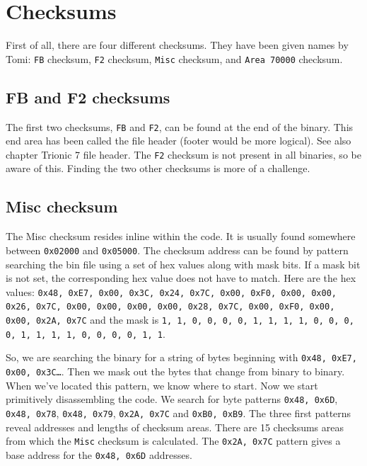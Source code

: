 \documentclass[11pt,a4paper]{book}
\begin{document}
\section{Checksums}
First of all, there are four different checksums. They have been given names by
Tomi: \texttt{FB} checksum,
\texttt{F2} checksum,
\texttt{Misc} checksum, and \texttt{Area 70000}
checksum.

\subsection{FB and F2 checksums}\label{sec:FBF2Checksum}
The first two checksums, \texttt{FB} and \texttt{F2}, can be found at the end of
the binary. This end area has been called the file header (footer would be more
logical). See also chapter Trionic 7 file header. The
\texttt{F2} checksum is not present in all binaries, so be aware of this.
Finding the two other checksums is more of a challenge.

\subsection{Misc checksum}
The Misc checksum resides inline within the code. It is usually found somewhere
between \texttt{0x02000} and \texttt{0x05000}. The checksum address can be found
by pattern searching the bin file using a set of hex values along with mask
bits. If a mask bit is not set, the corresponding hex value does not have to
match. Here are the hex values: \texttt{0x48, 0xE7, 0x00, 0x3C, 0x24, 0x7C,
    0x00, 0xF0, 0x00, 0x00, 0x26, 0x7C, 0x00, 0x00, 0x00, 0x00, 0x28, 0x7C,
    0x00, 0xF0, 0x00, 0x00, 0x2A, 0x7C} and the mask is \texttt{1, 1, 0, 0, 0,
0, 1, 1, 1, 1, 0, 0, 0, 0, 1, 1, 1, 1, 0, 0, 0, 0, 1, 1}.

So, we are searching the binary for a string of bytes beginning with
\texttt{0x48, 0xE7, 0x00, 0x3C\ldots}. Then we mask out the bytes that change
from binary to binary. When we've located this pattern, we know where to start.
Now we start primitively disassembling the code. We search for byte patterns
\texttt{0x48, 0x6D}, \texttt{0x48, 0x78}, \texttt{0x48, 0x79}, \texttt{0x2A,
0x7C} and \texttt{0xB0, 0xB9}. The three first patterns reveal addresses and
lengths of checksum areas. There are 15 checksums areas from which the
\texttt{Misc} checksum is calculated. The \texttt{0x2A, 0x7C} pattern gives a
base address for the \texttt{0x48, 0x6D} addresses.
\end{document}
